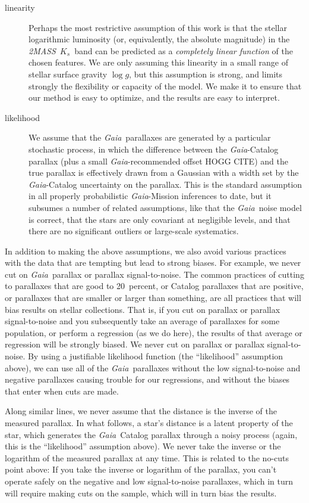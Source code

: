\documentclass[modern]{aastex62}
\newcommand{\acronym}[1]{{\small{#1}}}
\newcommand{\project}[1]{\textsl{#1}}
\newcommand{\gaia}{\project{Gaia}}
\newcommand{\zmass}{\project{\acronym{2MASS}}}
\newcommand{\logg}{\log g}
\begin{document}
\begin{description}
\item[linearity] Perhaps the most restrictive assumption of this work is that
the stellar logarithmic luminosity (or, equivalently, the absolute magnitude) in
the \zmass\ $K_s$~band can be predicted as a \emph{completely linear function} of
the chosen features. We are only assuming this linearity in a small range of stellar
surface gravity $\logg$, but this assumption is strong, and limits strongly the
flexibility or capacity of the model.
We make it to ensure that our method is easy to optimize, and the results are easy
to interpret.

\item[likelihood] We assume that the \gaia\ parallaxes are generated by a particular
stochastic process, in which the difference between the \gaia-Catalog parallax (plus
a small \gaia-recommended offset HOGG CITE) and the true parallax is effectively drawn from a
Gaussian with a width set by the \gaia-Catalog uncertainty on the parallax.
This is the standard assumption in all properly probabilistic \gaia-Mission inferences
to date, but it subsumes a number of related assumptions, like that the \gaia\ noise
model is correct, that the stars are only covariant at negligible levels, and that
there are no significant outliers or large-scale systematics.
\end{description}

In addition to making the above assumptions, we also avoid various practices
with the data that are tempting but lead to strong biases.
For example, we never cut on \gaia\ parallax or parallax signal-to-noise.
The common practices of cutting to parallaxes that are good to 20~percent,
or Catalog parallaxes that are positive, or parallaxes that are smaller or
larger than something, are all practices that will bias results on stellar
collections.
That is, if you cut on parallax or parallax signal-to-noise and you subsequently
take an average of parallaxes for some population, or perform a regression (as we
do here), the results of that average or regression will be strongly biased.
We never cut on parallax or parallax signal-to-noise.
By using a justifiable likelihood function (the ``likelihood'' assumption above),
we can use all of the \gaia\ parallaxes without the low signal-to-noise and
negative parallaxes causing trouble for our regressions, and without the biases
that enter when cuts are made.

Along similar lines, we never assume that the distance is the inverse of the
measured parallax.
In what follows, a star's distance is a latent property of the star, which generates
the \gaia\ Catalog parallax through a noisy process (again, this is
the ``likelihood'' assumption above).
We never take the inverse or the logarithm of the measured parallax at any time.
This is related to the no-cuts point above:
If you take the inverse or logarithm of the parallax, you can't operate safely
on the negative and low signal-to-noise parallaxes, which in turn will require
making cuts on the sample, which will in turn bias the results.
\end{document}
